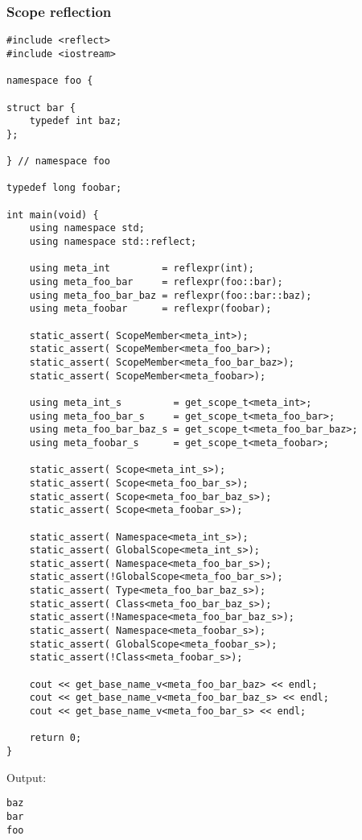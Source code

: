 \subsubsection{Scope reflection}

\begin{verbatim}
#include <reflect>
#include <iostream>

namespace foo {

struct bar {
	typedef int baz;
};

} // namespace foo

typedef long foobar;

int main(void) {
	using namespace std;
	using namespace std::reflect;

	using meta_int         = reflexpr(int);
	using meta_foo_bar     = reflexpr(foo::bar);
	using meta_foo_bar_baz = reflexpr(foo::bar::baz);
	using meta_foobar      = reflexpr(foobar);

	static_assert( ScopeMember<meta_int>);
	static_assert( ScopeMember<meta_foo_bar>);
	static_assert( ScopeMember<meta_foo_bar_baz>);
	static_assert( ScopeMember<meta_foobar>);

	using meta_int_s         = get_scope_t<meta_int>;
	using meta_foo_bar_s     = get_scope_t<meta_foo_bar>;
	using meta_foo_bar_baz_s = get_scope_t<meta_foo_bar_baz>;
	using meta_foobar_s      = get_scope_t<meta_foobar>;

	static_assert( Scope<meta_int_s>);
	static_assert( Scope<meta_foo_bar_s>);
	static_assert( Scope<meta_foo_bar_baz_s>);
	static_assert( Scope<meta_foobar_s>);

	static_assert( Namespace<meta_int_s>);
	static_assert( GlobalScope<meta_int_s>);
	static_assert( Namespace<meta_foo_bar_s>);
	static_assert(!GlobalScope<meta_foo_bar_s>);
	static_assert( Type<meta_foo_bar_baz_s>);
	static_assert( Class<meta_foo_bar_baz_s>);
	static_assert(!Namespace<meta_foo_bar_baz_s>);
	static_assert( Namespace<meta_foobar_s>);
	static_assert( GlobalScope<meta_foobar_s>);
	static_assert(!Class<meta_foobar_s>);

	cout << get_base_name_v<meta_foo_bar_baz> << endl;
	cout << get_base_name_v<meta_foo_bar_baz_s> << endl;
	cout << get_base_name_v<meta_foo_bar_s> << endl;

	return 0;
}
\end{verbatim}

Output:

\begin{verbatim}
baz
bar
foo
\end{verbatim}

